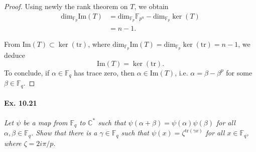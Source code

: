 \documentclass[11pt,a4paper]{article}
\newcommand{\C}{\mathbb{C}}
\newcommand{\F}{\mathbb{F}}
\begin{document}
\begin{proof}
Using newly the rank theorem on $T$, we obtain
\begin{align*}
\mathrm{dim}_{\F_p} \mathrm{Im}(T) &= \mathrm{dim}_{\F_p} \F_{p^n} - \mathrm{dim}_{\F_p} \ker(T)\\
&=n-1.
\end{align*}

From $\mathrm{Im}(T) \subset \ker(\mathrm{tr})$, where $\mathrm{dim}_{\F_p} \mathrm{Im}(T) = \mathrm{dim}_{\F_p} \ker(\mathrm{tr}) = n-1$, we deduce 
$$\mathrm{Im}(T) = \ker(\mathrm{tr}).$$
To conclude, if $\alpha \in \F_q$ has trace zero, then $\alpha \in \mathrm{Im}(T)$, i.e. $\alpha = \beta - \beta^p$ for some $\beta \in \F_q$.
\end{proof}



\paragraph{Ex. 10.21} {\it Let $\psi$ be a map from $\F_q$ to $\C^*$ such that $\psi(\alpha + \beta) = \psi(\alpha)\psi(\beta)$ for all $\alpha, \beta \in \F_q$. Show that there is a $\gamma \in \F_q$ such that $\psi(x) = \zeta^{\mathrm{tr}(\gamma x)}$ for all $x \in \F_q$, where $\zeta = {2i\pi/p}$.
}
\end{document}
